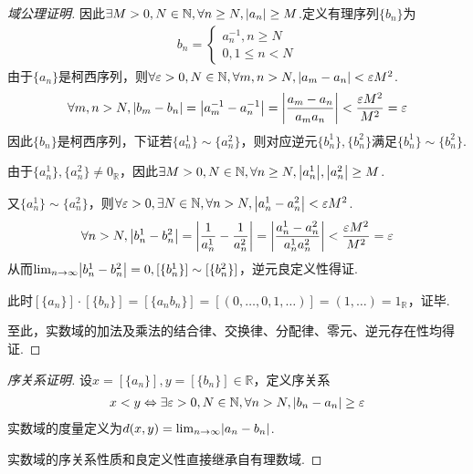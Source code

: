 \begin{proof}[域公理证明]
    因此\(\exists M>0, N \in \mathbb{N}, \forall n \geq N, \abs*{a_n} \geq M\).定义有理序列\(\{b_n\}\)为
    \begin{align*}
        b_n=
        \begin{cases}
            a_n^{-1}, n \geq N \\
            0, 1 \leq n<N
        \end{cases}
    \end{align*}
    由于\(\{a_n\}\)是柯西序列，则\(\forall \varepsilon>0, N \in \mathbb{N}, \forall m,n>N, \abs*{a_m-a_n}<\varepsilon M^2\).
    \begin{align*}
        \forall m,n>N, \abs*{b_m-b_n}=\abs*{a_m^{-1}-a_n^{-1}}=\abs*{\frac{a_m-a_n}{a_ma_n}}<\frac{\varepsilon M^2}{M^2}=\varepsilon
    \end{align*}
    因此\(\{b_n\}\)是柯西序列，下证若\(\{a_n^1\} \sim \{a_n^2\}\)，则对应逆元\(\{b_n^1\},\{b_n^2\}\)满足\(\{b_n^1\} \sim \{b_n^2\}\).

    由于\(\{a_n^1\},\{a_n^2\} \ne 0_{\mathbb{R}}\)，因此\(\exists M>0, N \in \mathbb{N}, \forall n \geq N, \abs*{a_n^1},\abs*{a_n^2} \geq M\).

    又\(\{a_n^1\} \sim \{a_n^2\}\)，则\(\forall \varepsilon>0, \exists N \in \mathbb{N}, \forall n>N, \abs*{a_n^1-a_n^2}<\varepsilon M^2\).
    \begin{align*}
        \forall n>N, \abs*{b_n^1-b_n^2}=\abs*{\frac{1}{a_n^1}-\frac{1}{a_n^2}}=\abs*{\frac{a_n^1-a_n^2}{a_n^1a_n^2}}<\frac{\varepsilon M^2}{M^2}=\varepsilon 
    \end{align*}
    从而\(\lim_{n \to \infty}\abs*{b_n^1-b_n^2}=0, [\{b_n^1\}] \sim [\{b_n^2\}]\)，逆元良定义性得证.

    此时\([\{a_n\}] \cdot [\{b_n\}]=[\{a_nb_n\}]=[(0,\dots,0,1,\dots)]=(1,\dots)=1_{\mathbb{R}}\)，证毕.

    {\kaishu 至此，实数域的加法及乘法的结合律、交换律、分配律、零元、逆元存在性均得证.}
\end{proof}

\begin{proof}[序关系证明]
    设\(x=[\{a_n\}],y=[\{b_n\}] \in \mathbb{R}\)，定义序关系
    \begin{align*}
        x<y \Leftrightarrow \exists \varepsilon>0, N \in \mathbb{N}, \forall n>N, \abs*{b_n-a_n} \geq \varepsilon 
    \end{align*}
    实数域的度量定义为\(d(x,y)=\lim_{n \to \infty}\abs*{a_n-b_n}\).

    {\kaishu 实数域的序关系性质和良定义性直接继承自有理数域.}
\end{proof}

